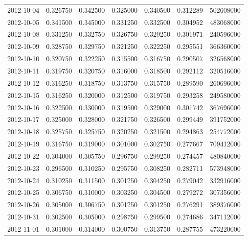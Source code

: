 \begin{tabular}{lrrrrrr}
2012-10-04 &    0.326750 &    0.342500 &    0.325000 &    0.340500 &    0.312289 &   502608000 \\
2012-10-05 &    0.341500 &    0.345000 &    0.331250 &    0.332500 &    0.304952 &   483068000 \\
2012-10-08 &    0.331250 &    0.332750 &    0.326750 &    0.329250 &    0.301971 &   240596000 \\
2012-10-09 &    0.328750 &    0.329750 &    0.321250 &    0.322250 &    0.295551 &   366360000 \\
2012-10-10 &    0.320750 &    0.322250 &    0.315500 &    0.316750 &    0.290507 &   326568000 \\
2012-10-11 &    0.319750 &    0.320750 &    0.316000 &    0.318500 &    0.292112 &   320516000 \\
2012-10-12 &    0.316250 &    0.318750 &    0.313750 &    0.315750 &    0.289590 &   260696000 \\
2012-10-15 &    0.316250 &    0.320000 &    0.312500 &    0.319750 &    0.293258 &   249580000 \\
2012-10-16 &    0.322500 &    0.330000 &    0.319500 &    0.329000 &    0.301742 &   367696000 \\
2012-10-17 &    0.325000 &    0.328000 &    0.321750 &    0.326500 &    0.299449 &   391752000 \\
2012-10-18 &    0.325750 &    0.325750 &    0.320250 &    0.321500 &    0.294863 &   254772000 \\
2012-10-19 &    0.316750 &    0.319000 &    0.301000 &    0.302750 &    0.277667 &   709412000 \\
2012-10-22 &    0.304000 &    0.305750 &    0.296750 &    0.299250 &    0.274457 &   480840000 \\
2012-10-23 &    0.296500 &    0.310250 &    0.295750 &    0.308250 &    0.282711 &   573948000 \\
2012-10-24 &    0.310250 &    0.311500 &    0.301250 &    0.304250 &    0.279042 &   332916000 \\
2012-10-25 &    0.306750 &    0.310000 &    0.303250 &    0.304500 &    0.279272 &   307356000 \\
2012-10-26 &    0.305000 &    0.306750 &    0.301250 &    0.301250 &    0.276291 &   389376000 \\
2012-10-31 &    0.302500 &    0.305000 &    0.298750 &    0.299500 &    0.274686 &   347112000 \\
2012-11-01 &    0.301000 &    0.314000 &    0.300750 &    0.313750 &    0.287755 &   473220000 \\

\end{tabular}
